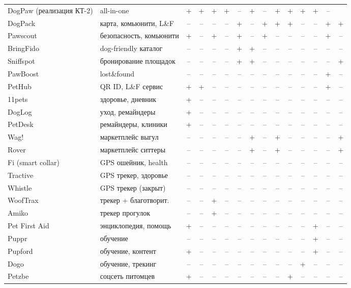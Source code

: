 \documentclass[12pt,a4paper]{article}
\begin{document}
\begin{longtable}{@{}p{1.55cm}p{1.45cm}ccccccccccccc@{}}
DogPaw (реализация КТ-2) & all-in-one & + & + & + & + & -- & + & -- & + & + & + & + & -- \\
DogPack & карта, комьюнити, L\&F & -- & -- & -- & -- & + & -- & + & + & + & -- & -- & + & + \\
Pawscout & безопасность, комьюнити & + & -- & + & -- & + & -- & + & -- & -- & -- & -- & + & -- \\
BringFido & dog-friendly каталог & -- & -- & -- & -- & + & + & -- & -- & -- & -- & -- & -- & -- \\
Sniffspot & бронирование площадок & -- & -- & -- & -- & + & + & -- & -- & -- & -- & -- & -- & + \\
PawBoost & lost\&found & -- & -- & -- & -- & -- & -- & -- & -- & -- & -- & -- & + & -- \\
PetHub & QR ID, L\&F сервис & + & + & -- & -- & -- & -- & -- & -- & -- & -- & -- & + & -- \\
11pets & здоровье, дневник & + & -- & -- & -- & -- & -- & -- & -- & -- & -- & -- & -- & -- \\
DogLog & уход, ремайндеры & + & -- & -- & -- & -- & -- & -- & -- & -- & -- & -- & -- & -- \\
PetDesk & ремайндеры, клиники & + & -- & -- & -- & -- & -- & -- & -- & -- & -- & -- & -- & -- \\
Wag! & маркетплейс выгул & -- & -- & -- & -- & -- & + & -- & + & -- & -- & -- & -- & + \\
Rover & маркетплейс ситтеры & -- & -- & -- & -- & -- & + & -- & + & -- & -- & -- & -- & + \\
Fi (smart collar) & GPS ошейник, health & -- & -- & -- & -- & -- & -- & -- & -- & -- & -- & -- & -- & -- \\
Tractive & GPS трекер, здоровье & -- & -- & -- & -- & -- & -- & -- & -- & -- & -- & -- & -- & -- \\
Whistle & GPS трекер (закрыт) & -- & -- & -- & -- & -- & -- & -- & -- & -- & -- & -- & -- & -- \\
WoofTrax & трекер + благотворит. & -- & -- & + & -- & -- & -- & -- & -- & -- & -- & -- & -- & -- \\
Amiko & трекер прогулок & -- & -- & + & -- & -- & -- & -- & -- & -- & -- & -- & -- & -- \\
Pet First Aid & энциклопедия, помощь & + & -- & -- & -- & -- & -- & -- & -- & -- & -- & + & -- & -- \\
Puppr & обучение & -- & -- & -- & -- & -- & -- & -- & -- & -- & -- & + & -- & -- \\
Pupford & обучение, контент & + & -- & -- & -- & -- & -- & -- & -- & -- & -- & + & -- & -- \\
Dogo & обучение, трекинг & -- & -- & -- & -- & -- & -- & -- & -- & -- & + & -- & -- & -- \\
Petzbe & соцсеть питомцев & + & -- & -- & -- & -- & -- & -- & -- & + & -- & -- & -- & -- \\
\bottomrule
\end{longtable}
\normalsize
\end{document}
